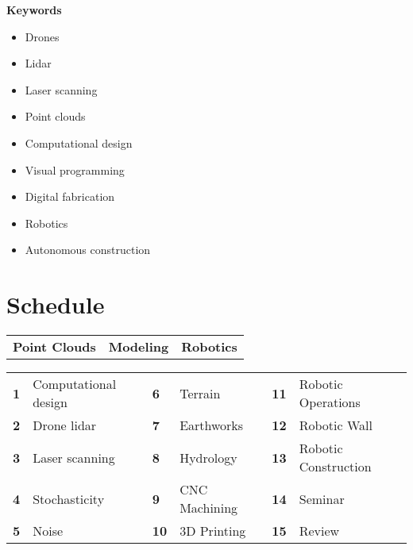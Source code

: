 \documentclass[11pt,article,oneside]{memoir}
\begin{document}
\noindent
\textbf{Keywords}
\begin{multicols}{3}
\raggedright
\small
\begin{itemize}
\item Drones
\item Lidar
\item Laser scanning
\item Point clouds
\item Computational design
\item Visual programming
\item Digital fabrication
\item Robotics
\item Autonomous construction
\end{itemize}
\end{multicols}

\section{Schedule}

\begin{table}[H]
\begin{tabular}{l @{\hskip 2.36cm} l @{\hskip 2.6cm} l}
\textbf{Point Clouds} & \textbf{Modeling} & \textbf{Robotics}\\
\end{tabular}
\end{table}
%
\vspace*{-1em}
%
\begin{table}[H]
\small
\begin{tabular}{l l l l l l}
\small
\textbf{1} & Computational design \hspace{1em}  & \textbf{6} & Terrain  \hspace{6em}  & \textbf{11} & Robotic Operations\\
\textbf{2} & Drone lidar & \textbf{7} & Earthworks & \textbf{12} & Robotic Wall\\
\textbf{3} & Laser scanning & \textbf{8} & Hydrology & \textbf{13} & Robotic Construction\\
\textbf{4} & Stochasticity  & \textbf{9} & CNC Machining & \textbf{14} & Seminar\\
\textbf{5} & Noise & \textbf{10} & 3D Printing & \textbf{15} & Review\\

\end{tabular}
\end{table}
\end{document}
